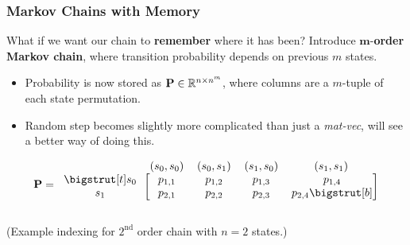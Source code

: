 \documentclass{beamer}
\begin{document}
\begin{frame}
\frametitle{Markov Chains with Memory}
What if we want our chain to \textbf{remember} where it has been?  Introduce $\boldsymbol{m}$-\textbf{order Markov chain}, where transition probability depends on previous $m$ states.

\begin{itemize}
\item Probability is now stored as ${\bf P} \in \mathbb{R}^{n \times n^m}$, where columns are a $m$-tuple of each state permutation.
\item Random step becomes slightly more complicated than just a \textit{mat-vec}, will see a better way of doing this.
\end{itemize}

\begin{block}{}

\[
{\bf P} =
\begin{blockarray}{ccccc}
& \left(s_0, s_0\right) & \left(s_0, s_1\right) & \left(s_1, s_0\right) & \left(s_1, s_1\right) \\
 \begin{block}{c[cccc]}
	\bigstrut[t]
	s_0 & p_{1,1} & p_{1,2} & p_{1,3} & p_{1,4} \\
	s_1 & p_{2,1} & p_{2,2} & p_{2,3} & p_{2,4}
	\bigstrut[b] \\
 \end{block}
\end{blockarray}
\]

\centering
\begin{tiny}
(Example indexing for $2^{\text{nd}}$ order chain with $n=2$ states.)
\end{tiny}

\end{block}

\end{frame}
\end{document}
